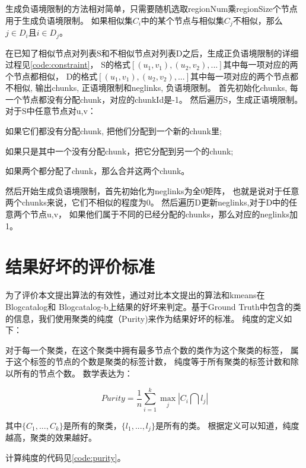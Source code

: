 生成负语境限制的方法相对简单，只需要随机选取regionNum乘regionSize个节点用于生成负语境限制。
如果相似集$C_i$中的某个节点与相似集$C_j$不相似，那么$j \in D_i$且$i \in D_j$。

在已知了相似节点对列表S和不相似节点对列表D之后，生成正负语境限制的详细过程见\ref{code:constraint}，
S的格式$[(u_1, v_1), (u_2, v_2), ...]$其中每一项对应的两个节点都相似，
D的格式$[(u_1, v_1), (u_2, v_2), ...]$其中每一项对应的两个节点都不相似,
输出chunks, 正语境限制和neglinks, 负语境限制。
首先初始化chunks, 每一个节点都没有分配chunk，对应的chunkId是-1。
然后遍历S，生成正语境限制。对于S中任意节点对u,v：
\begin{inparaenum}[a)]
    \item 如果它们都没有分配chunk, 把他们分配到一个新的chunk里;
    \item 如果只是其中一个没有分配chunk，把它分配到另一个的chunk;
    \item 如果两个都分配了chunk，那么合并这两个chunk。
\end{inparaenum}
然后开始生成负语境限制，首先初始化为neglinks为全0矩阵，
也就是说对于任意两个chunks来说，它们不相似的程度为0。
然后遍历D更新neglinks,对于D中的任意两个节点u,v，
如果他们属于不同的已经分配的chunks，那么对应的neglinks加1。

\section{结果好坏的评价标准}

为了评价本文提出算法的有效性，通过对比本文提出的算法和kmeans在Blogcatalog和
Blogcatalog-b上结果的好坏来判定。基于Ground Truth中包含的类的信息，我们使用聚类的纯度（Purity)来作为结果好坏的标准。
纯度的定义如下：

对于每一个聚类，在这个聚类中拥有最多节点个数的类作为这个聚类的标签，
属于这个标签的节点的个数是聚类的标签计数，
纯度等于所有聚类的标签计数和除以所有的节点个数。
数学表达为：

\begin{equation}
\label{equa:purity}
Purity = \frac{1}{n} \sum_{i=1}^k \operatorname{max}_j |C_i \bigcap l_j|
\end{equation}

其中$\{C_1, ..., C_k\}$是所有的聚类，$\{l_1, ..., l_j\}$是所有的类。
根据定义可以知道，纯度越高，聚类的效果越好。

计算纯度的代码见\ref{code:purity}。

